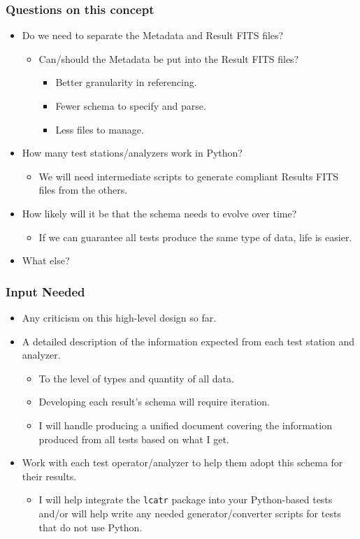 \documentclass[xcolor=dvipsnames]{beamer}
\begin{document}
\begin{frame}
  \frametitle{Questions on this concept}
  \begin{itemize}
  \item Do we need to separate the Metadata and Result FITS files?
    \begin{itemize}
    \item Can/should the Metadata be put into the Result FITS files?
      \begin{itemize}
      \item Better granularity in referencing.
      \item Fewer schema to specify and parse.
      \item Less files to manage.
      \end{itemize}
    \end{itemize}
  \item How many test stations/analyzers work in Python?  
    \begin{itemize}
    \item We will need intermediate scripts to generate compliant
      Results FITS files from the others.
    \end{itemize}
  \item How likely will it be that the schema needs to evolve over
    time?
    \begin{itemize}
    \item If we can guarantee all tests produce the same type of data,
      life is easier.
    \end{itemize}
  \item What else?
  \end{itemize}
\end{frame}

\begin{frame}
  \frametitle{Input Needed}
  \begin{itemize}
  \item Any criticism on this high-level design so far.
  \item A detailed description of the information expected from each
    test station and analyzer.
    \begin{itemize}
    \item To the level of types and quantity of all data.
    \item Developing each result's schema will require iteration.
    \item I will handle producing a unified document covering the
      information produced from all tests based on what I get.
    \end{itemize}
  \item Work with each test operator/analyzer to help them adopt this
    schema for their results.
    \begin{itemize}
    \item I will help integrate the \texttt{lcatr} package into your
      Python-based tests and/or will help write any needed
      generator/converter scripts for tests that do not use Python.
    \end{itemize}
  \end{itemize}
\end{frame}
\end{document}

